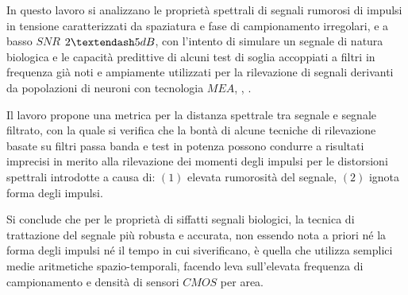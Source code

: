 
\summary%
% 
% 

In questo lavoro si analizzano le proprietà spettrali di segnali rumorosi di impulsi in tensione caratterizzati da spaziatura e fase di campionamento irregolari, e a basso $SNR$ $2\textendash 5 dB$, con l'intento di simulare un segnale di natura biologica e le capacità predittive di alcuni test di soglia accoppiati a filtri in frequenza già noti e ampiamente utilizzati per la rilevazione di segnali derivanti da popolazioni di neuroni con tecnologia $MEA$, \cite{Lambacher2011}, \cite{Vallicelli2017}. 

Il lavoro propone una metrica per la distanza spettrale tra segnale e segnale filtrato, con la quale si verifica che la bontà di alcune tecniche di rilevazione basate su filtri passa banda e test in potenza possono condurre a risultati imprecisi in merito alla rilevazione dei momenti degli impulsi per le distorsioni spettrali introdotte a causa di: $(1)$ elevata rumorosità del segnale, $(2)$ ignota forma degli impulsi.

Si conclude che per le proprietà di siffatti segnali biologici, la tecnica di trattazione del segnale più robusta e accurata, non essendo nota a priori né la forma degli impulsi né il tempo in cui siverificano, è quella che utilizza semplici medie aritmetiche spazio-temporali, facendo leva sull'elevata frequenza di campionamento e densità di sensori $CMOS$ per area.



\emptypage %
% 
% 

% 
% 
% 

